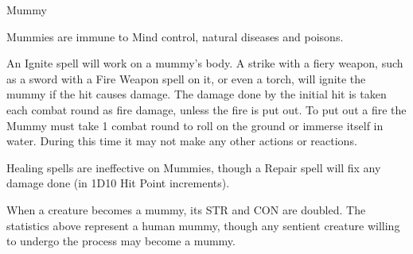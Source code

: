 \begin{monsterbox}{Mummy}
\begin{rpg-monsteraction}[Immunities]
		Mummies are immune to Mind control, natural diseases and poisons.
	\end{rpg-monsteraction}
	\begin{rpg-monsteraction}[Flammable]
		An Ignite spell will work on a mummy’s body. A strike with a fiery weapon, such as a sword with a Fire Weapon spell on it, or even a torch, will ignite the mummy if the hit causes damage. The damage done by the initial hit is taken each combat round as fire damage, unless the fire is put out. To put out a fire the Mummy must take 1 combat round to roll on the ground or immerse itself in water. During this time it may not make any other actions or reactions.
	\end{rpg-monsteraction}
	\begin{rpg-monsteraction}
		Healing spells are ineffective on Mummies, though a Repair spell will fix any damage done (in 1D10 Hit Point increments).
	\end{rpg-monsteraction}
	\begin{rpg-monsteraction}
		When a creature becomes a mummy, its STR and CON are doubled. The statistics above represent a human mummy, though any sentient creature willing to undergo the process may become a mummy.
	\end{rpg-monsteraction}

\end{monsterbox}




